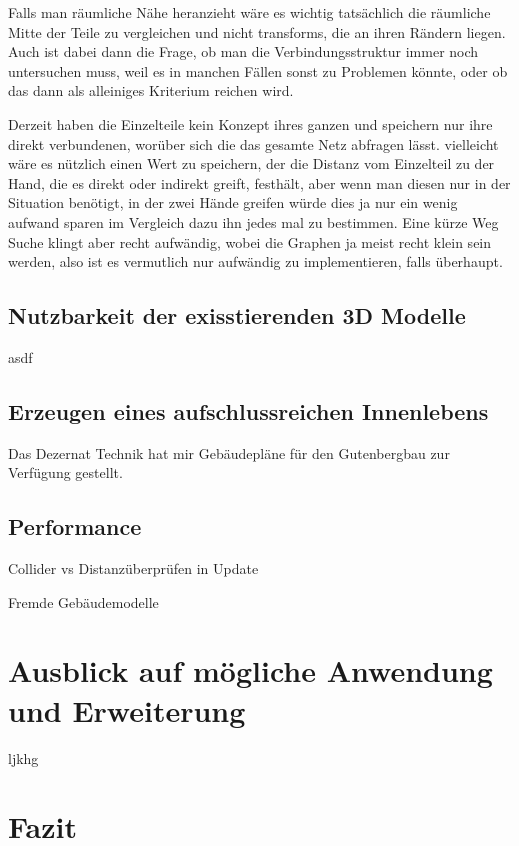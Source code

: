 \documentclass[11pt]{article} %
\begin{document}
Falls man räumliche Nähe heranzieht wäre es wichtig tatsächlich die räumliche Mitte der Teile zu vergleichen und nicht transforms, die an ihren Rändern liegen. Auch ist dabei dann die Frage, ob man die Verbindungsstruktur immer noch untersuchen muss, weil es in manchen Fällen sonst zu Problemen könnte, oder ob das dann als alleiniges Kriterium reichen wird.

Derzeit haben die Einzelteile kein Konzept ihres ganzen und speichern nur ihre direkt verbundenen, worüber sich die das gesamte Netz abfragen lässt. vielleicht wäre es nützlich einen Wert zu speichern, der die Distanz vom Einzelteil zu der Hand, die es direkt oder indirekt greift, festhält, aber wenn man diesen nur in der Situation benötigt, in der zwei Hände greifen würde dies ja nur ein wenig aufwand sparen im Vergleich dazu ihn jedes mal zu bestimmen.
Eine kürze Weg Suche klingt aber recht aufwändig, wobei die Graphen ja meist recht klein sein werden, also ist es vermutlich nur aufwändig zu implementieren, falls überhaupt.



\subsection{Nutzbarkeit der exisstierenden 3D Modelle}

asdf

\subsection{Erzeugen eines aufschlussreichen Innenlebens}

Das Dezernat Technik hat mir Gebäudepläne für den Gutenbergbau zur Verfügung gestellt.

\subsection{Performance}

Collider vs Distanzüberprüfen in Update

Fremde Gebäudemodelle




\section{Ausblick auf mögliche Anwendung und Erweiterung}

ljkhg




\section {Fazit}
\end{document}
